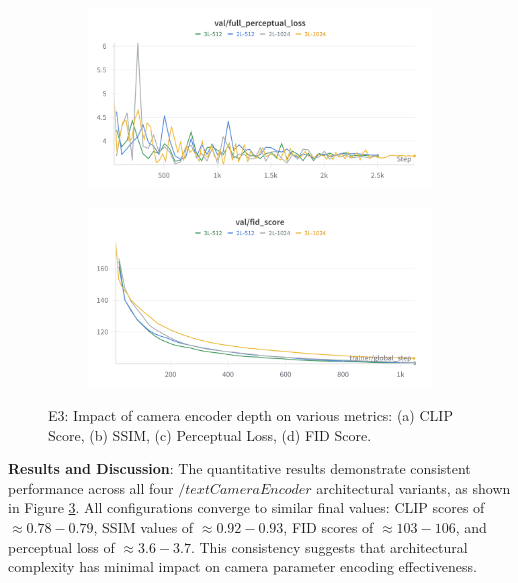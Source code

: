 \begin{figure}[htbp]
  \begin{subfigure}[b]{0.48\textwidth}
    \centering
    \includegraphics[width=\textwidth]{images/experiments/cam_depth/perceptual.png}
    \label{fig:exp_cam_depth_perceptual}
  \end{subfigure}
  \hfill
  \begin{subfigure}[b]{0.48\textwidth}
    \centering
    \includegraphics[width=\textwidth]{images/experiments/cam_depth/fid.png}
    \label{fig:exp_cam_depth_fid}
  \end{subfigure}

  \caption{E3: Impact of camera encoder depth on various metrics: (a) CLIP Score, (b) SSIM, (c) Perceptual Loss, (d) FID Score.}
  \label{fig:exp_cam_depth_metrics_grid}
\end{figure}

\textbf{Results and Discussion}:
The quantitative results demonstrate consistent performance across all four $/text{CameraEncoder}$ architectural variants, as shown in Figure \ref{fig:exp_cam_depth_metrics_grid}. All configurations converge to similar final values: CLIP scores of $\approx 0.78-0.79$, SSIM values of $\approx 0.92-0.93$, FID scores of $\approx 103-106$, and perceptual loss of $\approx 3.6-3.7$. This consistency suggests that architectural complexity has minimal impact on camera parameter encoding effectiveness.

